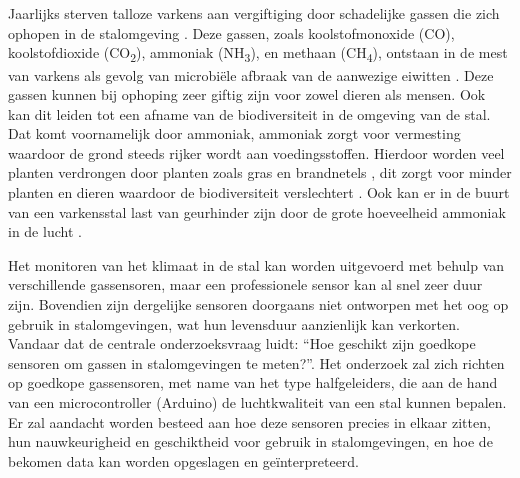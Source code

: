 
\chapter{}%
\label{ch:inleiding}


Jaarlijks sterven talloze varkens aan vergiftiging door schadelijke gassen die zich ophopen in de stalomgeving \autocite{Sercu2023}. Deze gassen, zoals koolstofmonoxide (CO), koolstofdioxide (CO\textsubscript{2}), ammoniak (NH\textsubscript{3}), en methaan (CH\textsubscript{4}), ontstaan in de mest van varkens als gevolg van microbiële afbraak van de aanwezige eiwitten \autocite{Wolf2013}. Deze gassen kunnen bij ophoping zeer giftig zijn voor zowel dieren als mensen. Ook kan dit leiden tot een afname van de biodiversiteit in de omgeving van de stal. Dat komt voornamelijk door ammoniak, ammoniak zorgt voor vermesting waardoor de grond steeds rijker wordt aan voedingsstoffen. Hierdoor worden veel planten verdrongen door planten zoals gras en brandnetels \autocite{Centraal2020},
dit zorgt voor minder planten en dieren waardoor de biodiversiteit verslechtert \autocite{Bol2020}. Ook kan er in de buurt van een varkensstal last van geurhinder zijn door de grote hoeveelheid ammoniak in de lucht \autocite{Rijksinstituut2020}.

Het monitoren van het klimaat in de stal kan worden uitgevoerd met behulp van verschillende gassensoren, maar een professionele sensor kan al snel zeer duur zijn. Bovendien zijn dergelijke sensoren doorgaans niet ontworpen met het oog op gebruik in stalomgevingen, wat hun levensduur aanzienlijk kan verkorten. Vandaar dat de centrale onderzoeksvraag luidt: ``Hoe geschikt zijn goedkope sensoren om gassen in stalomgevingen te meten?''. Het onderzoek zal zich richten op goedkope gassensoren, met name van het type halfgeleiders, die aan de hand van een microcontroller (Arduino) de luchtkwaliteit van een stal kunnen bepalen. Er zal aandacht worden besteed aan hoe deze sensoren precies in elkaar zitten, hun nauwkeurigheid en geschiktheid voor gebruik in stalomgevingen, en hoe de bekomen data kan worden opgeslagen en geïnterpreteerd.

